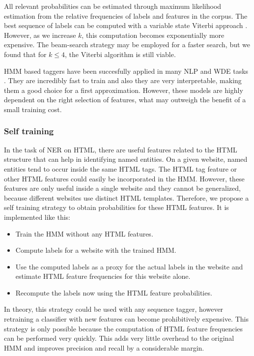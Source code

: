 \documentclass{nle}
\begin{document}
All relevant probabilities can be estimated through maximum likelihood estimation from the relative
frequencies of labels and features in the corpus. The best sequence of labels can be computed 
with a variable state Viterbi approach \cite{Li2000}. However, as we increase $ k $, this computation 
becomes exponentially more expensive. The beam-search strategy may be employed for a faster 
search, but we found that for $ k \leq 4 $, the Viterbi algorithm is still viable.

HMM based taggers have been succesfully applied in many NLP and WDE tasks 
\cite{Rabiner1990,Leek1997,Freitag2000}. They are incredibly fast to train and also they are very 
interpretable, making them a good choice for a first approximation. However, these models 
are highly dependent on the right selection of features, what may outweigh the benefit of a 
small training cost.

\subsubsection{Self training} \label{sssec:self_training}

In the task of NER on HTML, there are useful features related to the HTML
structure that can help in identifying named entities. On a given website, named
entities tend to occur inside the same HTML tags. The HTML tag feature or other
HTML features could easily be incorporated in the HMM. However, these 
features are only useful inside a single website and they cannot be generalized, 
because different websites use distinct HTML templates. 
Therefore, we propose a self training strategy to obtain probabilities for
these HTML features. It is implemented like this:

\begin{itemize}
\item Train the HMM without any HTML features.
\item Compute labels for a website with the trained HMM.
\item Use the computed labels as a proxy for the actual labels in the 
website and estimate HTML feature frequencies for this website alone.
\item Recompute the labels now using the HTML feature probabilities.
\end{itemize}

In theory, this strategy could be used with any sequence tagger, however
retraining a classifier with new features can become prohibitively expensive.
This strategy is only possible because the computation of HTML feature
frequencies can be performed very quickly. This adds very little overhead 
to the original HMM and improves precision and recall by a considerable 
margin.
\end{document}
